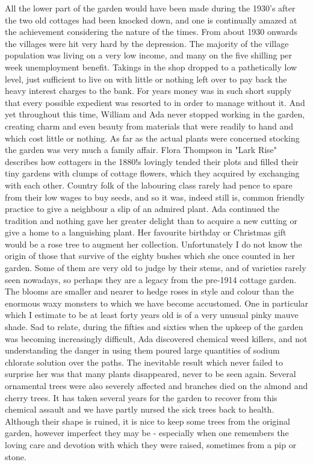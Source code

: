 All the lower part of the garden would have been made during the 1930's after the two old cottages had been knocked down, and one is continually amazed at the achievement considering the nature of the times. From about 1930 onwards the villages were hit very hard by the depression. The majority of the village population was living on a very low income, and many on the five shilling per week unemployment benefit. Takings in the shop dropped to a pathetically low level, just sufficient to live on with little or nothing left over to pay back the heavy interest charges to the bank. For years money was in such short supply that every possible expedient was resorted to in order to manage without it. And yet throughout this time, William and Ada never stopped working in the garden, creating charm and even beauty from materials that were readily to hand and which cost little or nothing. As far as the actual plants were concerned stocking the garden was very much a family affair. Flora Thompson in "Lark Rise" describes how cottagers in the 1880!s lovingly tended their plots and filled their tiny gardens with clumps of cottage flowers, which they acquired by exchanging with each other. Country folk of the labouring class rarely had pence to spare from their low wages to buy seeds, and so it was, indeed still is, common friendly practice to give a neighbour a slip of an admired plant. Ada continued the tradition and nothing gave her greater delight than to acquire a new cutting or give a home to a languishing plant. Her favourite birthday or Christmas gift would be a rose tree to augment her collection. Unfortunately I do not know the origin of those that survive of the eighty bushes which she once counted in her garden. Some of them are very old to judge by their stems, and of varieties rarely seen nowadays, so perhaps they are a legacy from the pre-1914 cottage garden. The blooms are smaller and nearer to hedge roses in style and colour than the enormous waxy monsters to which we have become accustomed. One in particular which I estimate to be at least forty years old is of a very unusual pinky mauve shade. Sad to relate, during the fifties and sixties when the upkeep of the garden was becoming increasingly difficult, Ada discovered chemical weed killers, and not understanding the danger in using them poured large quantities of sodium chlorate solution over the paths. The inevitable result which never failed to surprise her was that many plants disappeared, never to be seen again. Several ornamental trees were also severely affected and branches died on the almond and cherry trees. It has taken several years for the garden to recover from this chemical assault and we have partly nursed the sick trees back to health. Although their shape is ruined, it is nice to keep some trees from the original garden, however imperfect they may be - especially when one remembers the loving care and devotion with which they were raised, sometimes from a pip or stone.

